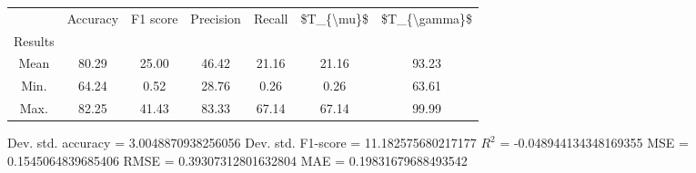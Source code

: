 \begin{tabular}{|c|c|c|c|c|c|c|}
\toprule
{} &  Accuracy &  F1 score &  Precision &  Recall &  \$T\_\{\textbackslash mu\}\$ &  \$T\_\{\textbackslash gamma\}\$ \\
Results &           &           &            &         &            &               \\
\hline
Mean    &     80.29 &     25.00 &      46.42 &   21.16 &      21.16 &         93.23 \\
Min.    &     64.24 &      0.52 &      28.76 &    0.26 &       0.26 &         63.61 \\
Max.    &     82.25 &     41.43 &      83.33 &   67.14 &      67.14 &         99.99 \\
\bottomrule
\end{tabular}

 Dev. std. accuracy = 3.0048870938256056
 Dev. std. F1-score = 11.182575680217177
 $R^2$ = -0.048944134348169355
 MSE = 0.1545064839685406
 RMSE = 0.39307312801632804
 MAE = 0.19831679688493542